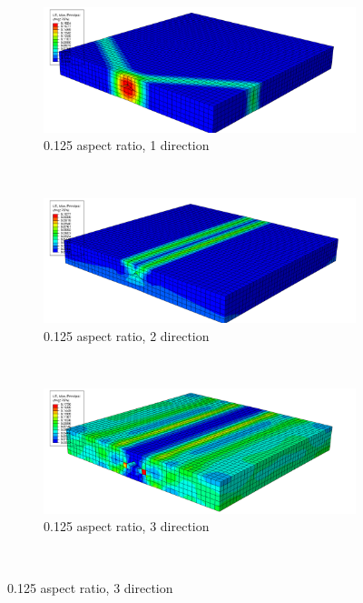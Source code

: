 \begin{figure}
\centering
  \begin{subfigure}[b]{0.6\textwidth}
    \includegraphics[width=\textwidth]{chapter_7_non-elasticmodelling/figures/0125p1.png}
    \caption{0.125 aspect ratio, 1 direction}
  \end{subfigure}
  \\
  \begin{subfigure}[b]{0.6\textwidth}
    \includegraphics[width=\textwidth]{chapter_7_non-elasticmodelling/figures/0125p2.png}
    \caption{0.125 aspect ratio, 2 direction}
  \end{subfigure}
  \\
    \begin{subfigure}[b]{0.60\textwidth}
    \includegraphics[width=\textwidth]{chapter_7_non-elasticmodelling/figures/0125p3.png}
    \caption{0.125 aspect ratio, 3 direction}
  \end{subfigure}
  \\

\end{figure}
